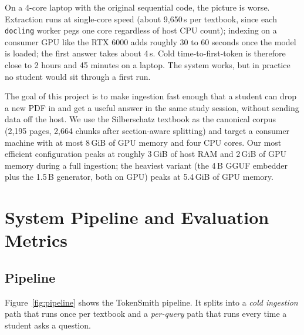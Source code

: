 \documentclass[sigconf]{acmart}
\begin{document}
On a 4-core laptop with the original sequential code, the picture is
worse. Extraction runs at single-core speed (about 9{,}650\,s per
textbook, since each \texttt{docling} worker pegs one core regardless
of host CPU count); indexing on a consumer GPU like the RTX 6000 adds
roughly 30 to 60 seconds once the model is loaded; the first answer
takes about 4\,s. Cold time-to-first-token is therefore close to 2
hours and 45 minutes on a laptop. The system works, but in practice
no student would sit through a first run.

The goal of this project is to make ingestion fast enough that a
student can drop a new PDF in and get a useful answer in the same
study session, without sending data off the host. We use the
Silberschatz textbook as the canonical corpus (2{,}195 pages, 2{,}664
chunks after section-aware splitting) and target a consumer machine
with at most 8\,GiB of GPU memory and four CPU cores. Our most
efficient configuration peaks at roughly 3\,GiB of host RAM and 2\,GiB
of GPU memory during a full ingestion; the heaviest variant (the 4\,B
GGUF embedder plus the 1.5\,B generator, both on GPU) peaks at
5.4\,GiB of GPU memory.

\section{System Pipeline and Evaluation Metrics}
\label{sec:system}

\subsection{Pipeline}

Figure~\ref{fig:pipeline} shows the TokenSmith pipeline. It splits
into a \emph{cold ingestion} path that runs once per textbook and a
\emph{per-query} path that runs every time a student asks a question.
\end{document}
